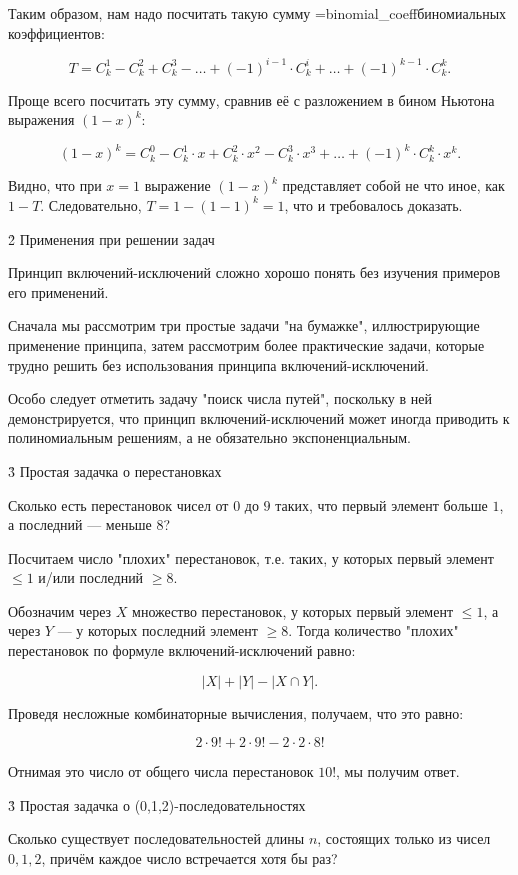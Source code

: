 Таким образом, нам надо посчитать такую сумму \algohref=binomial_coeff{биномиальных коэффициентов}:

$$ T = C_k^1 - C_k^2 + C_k^3 - \ldots + (-1)^{i-1} \cdot C_k^i + \ldots + (-1)^{k-1} \cdot C_k^k. $$

Проще всего посчитать эту сумму, сравнив её с разложением в бином Ньютона выражения $(1-x)^k$:

$$ (1-x)^k = C_k^0 - C_k^1 \cdot x + C_k^2 \cdot x^2 - C_k^3 \cdot x^3 + \ldots + (-1)^k \cdot C_k^k \cdot x^k. $$

Видно, что при $x=1$ выражение $(1-x)^k$ представляет собой не что иное, как $1 - T$. Следовательно, $T = 1 - (1-1)^k = 1$, что и требовалось доказать.


\h2{ Применения при решении задач }

Принцип включений-исключений сложно хорошо понять без изучения примеров его применений.

Сначала мы рассмотрим три простые задачи "на бумажке", иллюстрирующие применение принципа, затем рассмотрим более практические задачи, которые трудно решить без использования принципа включений-исключений.

Особо следует отметить задачу "поиск числа путей", поскольку в ней демонстрируется, что принцип включений-исключений может иногда приводить к полиномиальным решениям, а не обязательно экспоненциальным.


\h3{ Простая задачка о перестановках }

Сколько есть перестановок чисел от $0$ до $9$ таких, что первый элемент больше $1$, а последний --- меньше $8$?

Посчитаем число "плохих" перестановок, т.е. таких, у которых первый элемент $\le 1$ и/или последний $\ge 8$.

Обозначим через $X$ множество перестановок, у которых первый элемент $\le 1$, а через $Y$ --- у которых последний элемент $\ge 8$. Тогда количество "плохих" перестановок по формуле включений-исключений равно:

$$ |X| + |Y| - |X \cap Y|. $$

Проведя несложные комбинаторные вычисления, получаем, что это равно:

$$ 2 \cdot 9! + 2 \cdot 9! - 2 \cdot 2 \cdot 8! $$

Отнимая это число от общего числа перестановок $10!$, мы получим ответ.


\h3{ Простая задачка о (0,1,2)-последовательностях }

Сколько существует последовательностей длины $n$, состоящих только из чисел $0,1,2$, причём каждое число встречается хотя бы раз?

